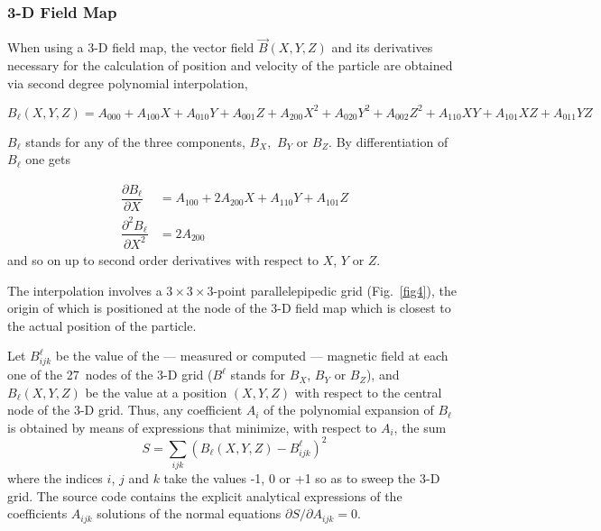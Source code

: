 \subsubsection{3-D Field Map} \label{sec2.4.4}

When using a 3-D field map, the vector field $ \vec  B(X,Y,Z) $ and its derivatives necessary
for the calculation of position and velocity of the particle are obtained 
via  second degree  polynomial interpolation, 

\begin{equation}
\!\!	B_{\ell} (X,Y,Z) = A_{000} + A_{100} X + A_{010} Y + A_{001} Z + 
	A_{200} X^2 + A_{020} Y^2  
	+     A_{002} Z^2 + A_{110} X Y + A_{101} X Z + A_{011} Y Z
	\label{eq2-4-12}
\end{equation}

\noindent$ B_{\ell} $ stands for any of the three components, $ B_X, $ $ B_Y $
or $ B_Z $.  By 
differentiation of $ B_{\ell} $ one gets 

\begin{equation}
	\begin{aligned}
		 \dfrac{ \partial B_{\ell} }{ \partial X} 
		    & =  A_{100} + 2 A_{200} X + A_{110} Y + A_{101} Z\\
		\dfrac{\partial^2 B_{\ell}}{ \partial X^2} 
		    & =  2 A_{200} 
	\end{aligned}
	\label{eq2-4-13}
\end{equation}
%
 and so on up to  second order derivatives with respect to  $X$, $ Y $ or $ Z $. 
 
\noindent The interpolation involves a $ 3  \times   3  \times   3$-point 
parallelepipedic grid (Fig.~\ref{fig4}),   
the origin of which is positioned at the node of the 3-D field map which is 
closest to the actual position of the particle. 
\medskip

\noindent Let $ B^{\ell}_{ijk} $ be the value of the --- measured or computed ---
magnetic field at each one of the 27~nodes of the 3-D grid ($ B^{\ell} $ stands for  
$ B_X$, $ B_Y $ or $ B_Z $), and $ B_{\ell} (X,Y,Z) $ be the value at a
position $ (X,Y,Z) $ 
with respect to the central node of the 3-D grid. Thus, any 
coefficient $ A_i $ of the polynomial expansion of $ B_{\ell} $ is obtained by
means of expressions that minimize, with respect to $ A_i $, the sum
%
\begin{equation}
	S = \sum_{ijk} \left(B_{\ell} (X,Y,Z)-B^{\ell}_{ijk} \right)^2 
	\label{eq2-4-14} %
\end{equation}
%
 where the indices $ i$, $j $ and $ k $ take the values -1, 0 or +1 so as
to sweep the 3-D grid. The source code contains the explicit analytical 
expressions of the coefficients $A_{ijk}$ solutions of the normal 
equations $\partial S / \partial A_{ijk} = 0$.






